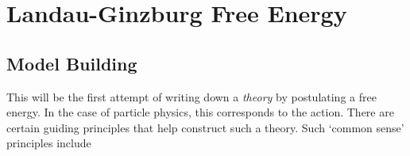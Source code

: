 \chapter{Landau-Ginzburg Free Energy}%
\label{cha:landau_ginzburg_free_energy}

\section{Model Building}%
\label{sec:model_building}

This will be the first attempt of writing down a \emph{theory} by postulating a free energy. In the case of particle physics, this corresponds to the action.
There are certain guiding principles that help construct such a theory. Such `common sense' principles include
